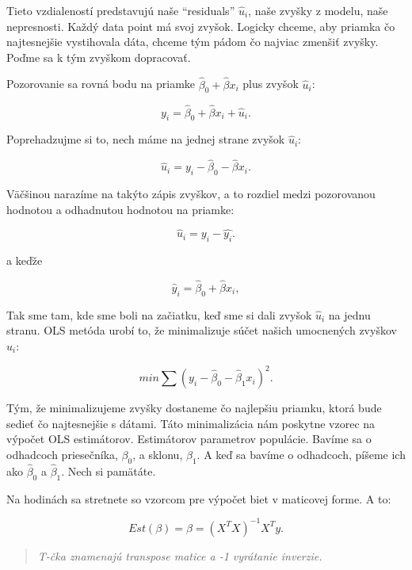 Tieto vzdialeností predstavujú naše ``residuals'' \(\hat{u}_i\), naše
zvyšky z modelu, naše nepresnosti. Každý data point má svoj zvyšok.
Logicky chceme, aby priamka čo najtesnejšie vystihovala dáta, chceme tým
pádom čo najviac zmenšiť zvyšky. Poďme sa k tým zvyškom dopracovať.

Pozorovanie sa rovná bodu na priamke \(\hat\beta_0 + \hat\beta{x}_i\)
plus zvyšok \(\hat{u}_i\):

\[ y_i = \hat\beta_0 + \hat\beta{x}_i + \hat{u}_i.\]

\begin{center}

Poprehadzujme si to, nech máme na jednej strane zvyšok \(\hat{u}_i\):

\end{center}

\[ \hat{u}_i = y_i - \hat\beta_0 - \hat\beta{x}_i.\]

Väčšinou narazíme na takýto zápis zvyškov, a to rozdiel medzi
pozorovanou hodnotou a odhadnutou hodnotou na priamke:

\[\hat{u}_i = y_i - \hat{y_i}.\]

\begin{center}

a keďže

\end{center}

\[ \hat{y}_i =\hat\beta_0 + \hat\beta{x}_i,\]

Tak sme tam, kde sme boli na začiatku, keď sme si dali zvyšok
\(\hat{u}_i\) na jednu stranu. OLS metóda urobí to, že minimalizuje
súčet našich umocnených zvyškov \(\hat{u}_i\):

\[min\sum (y_i - \hat\beta_0 - \hat\beta_1{x}_i)^2.\]

Tým, že minimalizujeme zvyšky dostaneme čo najlepšiu priamku, ktorá bude
sedieť čo najtesnejšie s dátami. Táto minimalizácia nám poskytne vzorec
na výpočet OLS estimátorov. Estimátorov parametrov populácie. Bavíme sa
o odhadcoch priesečníka, \(\beta_0\), a sklonu, \(\beta_1\). A keď sa
bavíme o odhadcoch, píšeme ich ako \(\hat\beta_0\) a \(\hat\beta_1\).
Nech si pamätáte.

Na hodinách sa stretnete so vzorcom pre výpočet biet v maticovej forme.
A to:

\[Est(\beta) = \hat\beta = (X^TX)^{-1}X^Ty.\]

\begin{quote}
\emph{T-čka znamenajú transpose matice a -1 vyrátanie inverzie.}
\end{quote}

